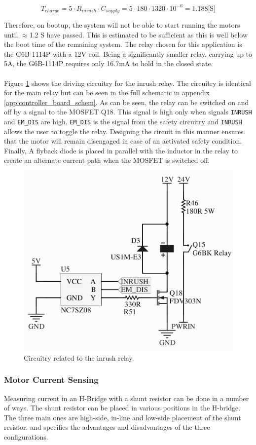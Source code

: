\begin{equation}
	T_{charge} = 5\cdot R_{inrush}\cdot C_{supply} = 5\cdot 180\cdot 1320\cdot10^{-6} = 1.188 \text{[S]}
\end{equation}

Therefore, on bootup, the system will not be able to start running the motors until $\approx$1.2 S have passed.
This is estimated to be sufficient as this is well below the boot time of the remaining system.
The relay chosen for this application is the G6B-1114P \cite{g6b} with a 12V coil.
Being a significantly smaller relay, carrying up to 5A, the G6B-1114P requires only 16.7mA to hold in the closed state.\\~\\
Figure \ref{fig:relaycircuit} shows the driving circuitry for the inrush relay. 
The circuitry is identical for the main relay but can be seen in the full schematic in appendix \ref{app:controller_board_schem}.
As can be seen, the relay can be switched on and off by a signal to the MOSFET Q18.
This signal is high only when signals \texttt{INRUSH} and \texttt{EM\_DIS} are high.
\texttt{EM\_DIS} is the signal from the safety circuitry and \texttt{INRUSH} allows the user to toggle the relay.
Designing the circuit in this manner ensures that the motor will remain disengaged in case of an activated safety condition.
Finally, A flyback diode is placed in parallel with the inductor in the relay to create an alternate current path when the MOSFET is switched off.

\begin{figure}[H]
	\centering
	\includegraphics[width=.5\linewidth]{graphics/relay_circuit}
	\caption{Circuitry related to the inrush relay.}
	\label{fig:relaycircuit}
\end{figure}


\subsubsection{Motor Current Sensing}
Measuring current in an H-Bridge with a shunt resistor can be done in a number of ways.
The shunt resistor can be placed in various positions in the H-bridge.
The three main ones are high-side, in-line and low-side placement of the shunt resistor.
\cite{shunt_placement} and \cite{Current_Sense_Circuit_Collection} specifies the advantages and disadvantages of the three configurations.

